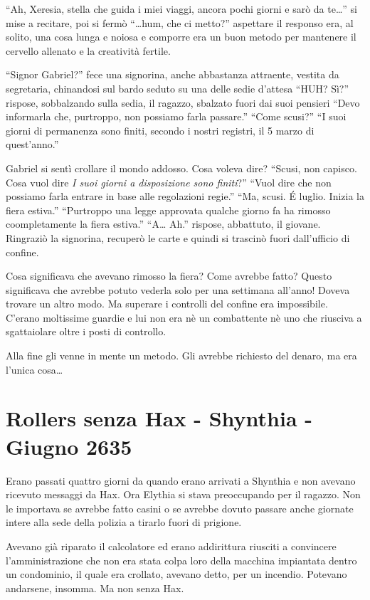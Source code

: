     ``Ah, Xeresia, stella che guida i miei viaggi, ancora pochi giorni e
    sarò da te\dots{}'' si mise a recitare, poi si fermò ``\dots{}hum, che
    ci metto?'' aspettare il responso era, al solito, una cosa lunga e
    noiosa e comporre era un buon metodo per mantenere il cervello allenato
    e la creatività fertile.

    ``Signor Gabriel?'' fece una signorina, anche abbastanza attraente,
    vestita da segretaria, chinandosi sul bardo seduto su una delle sedie
    d'attesa ``HUH? Sì?'' rispose, sobbalzando sulla sedia, il ragazzo,
    sbalzato fuori dai suoi pensieri ``Devo informarla che, purtroppo, non
    possiamo farla passare.'' ``Come scusi?'' ``I suoi giorni di
    permanenza sono finiti, secondo i nostri registri, il 5 marzo di
    quest'anno.''

    Gabriel si sentì crollare il mondo addosso. Cosa voleva dire? ``Scusi,
    non capisco. Cosa vuol dire \emph{I suoi giorni a disposizione sono
    finiti}?'' ``Vuol dire che non possiamo farla entrare in base alle
    regolazioni regie.'' ``Ma, scusi. \'E luglio. Inizia la fiera estiva.''
    ``Purtroppo una legge approvata qualche giorno fa ha rimosso
    coompletamente la fiera estiva.'' ``A\dots{} Ah.'' rispose, abbattuto,
    il giovane. Ringraziò la signorina, recuperò le carte e quindi si
    trascinò fuori dall'ufficio di confine.

    Cosa significava che avevano rimosso la fiera? Come avrebbe fatto?
    Questo significava che avrebbe potuto vederla solo per una settimana
    all'anno! Doveva trovare un altro modo. Ma superare i controlli del
    confine era impossibile. C'erano moltissime guardie e lui non era nè un
    combattente nè uno che riusciva a sgattaiolare oltre i posti di
    controllo.

    Alla fine gli venne in mente un metodo. Gli avrebbe richiesto del
    denaro, ma era l'unica cosa\dots{}

    \section{Rollers senza Hax - Shynthia - Giugno 2635}
    Erano passati quattro giorni da quando erano arrivati a Shynthia e non
    avevano ricevuto messaggi da Hax. Ora Elythia si stava preoccupando per
    il ragazzo. Non le importava se avrebbe fatto casini o se avrebbe
    dovuto passare anche giornate intere alla sede della polizia a tirarlo
    fuori di prigione.

    Avevano già riparato il calcolatore ed erano addirittura riusciti a
    convincere l'amministrazione che non era stata colpa loro della
    macchina impiantata dentro un condominio, il quale era crollato,
    avevano detto, per un incendio. Potevano andarsene, insomma. Ma non
    senza Hax.

